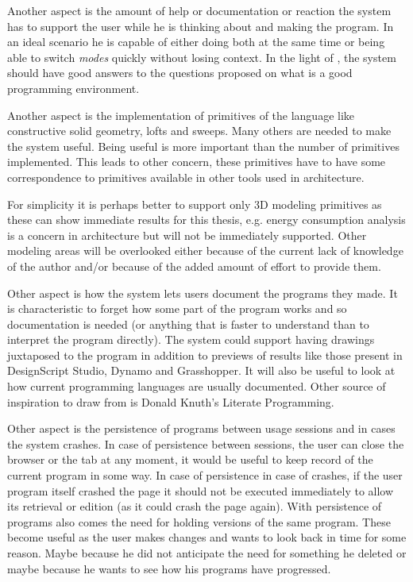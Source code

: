 \documentclass{./llncs2e/llncs}
\begin{document}
	Another aspect is the amount of help or documentation or reaction the system has to support the user while he is thinking about and making the program.
	In an ideal scenario he is capable of either doing both at the same time or being able to switch \emph{modes} quickly without losing context. 
	In the light of \cite{victor2012learnable}, the system should have good answers to the questions proposed on what is a good programming environment.

	Another aspect is the implementation of primitives of the language like constructive solid geometry, lofts and sweeps. 
	Many others are needed to make the system useful. 
	Being useful is more important than the number of primitives implemented. 
	This leads to other concern, these primitives have to have some correspondence to primitives available in other tools used in architecture.

	For simplicity it is perhaps better to support only 3D modeling primitives as these can show immediate results for this thesis, e.g. energy consumption analysis is a concern in architecture but will not be immediately supported. Other modeling areas will be overlooked either because of the current lack of knowledge of the author and/or because of the added amount of effort to provide them.

	Other aspect is how the system lets users document the programs they made. 
	It is characteristic to forget how some part of the program works and so documentation is needed (or anything that is faster to understand than to interpret the program directly). 
	The system could support having drawings juxtaposed to the program in addition to previews of results like those present in DesignScript Studio, Dynamo and Grasshopper. 
	It will also be useful to look at how current programming languages are usually documented. 
	Other source of inspiration to draw from is Donald Knuth's Literate Programming.

	Other aspect is the persistence of programs between usage sessions and in cases the system crashes.
	In case of persistence between sessions, the user can close the browser or the tab at any moment, it would be useful to keep record of the current program in some way. 
	In case of persistence in case of crashes, if the user program itself crashed the page it should not be executed immediately to allow its retrieval or edition (as it could crash the page again). 
	With persistence of programs also comes the need for holding versions of the same program. 
	These become useful as the user makes changes and wants to look back in time for some reason. 
	Maybe because he did not anticipate the need for something he deleted or maybe because he wants to see how his programs have progressed.
\end{document}
